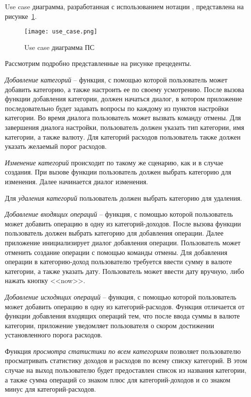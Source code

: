 Use case диаграмма, разработанная с использованием нотации \uml, представлена на рисунке~\ref{fig:domain:model:use_cases:model}.

\begin{figure}[!h]
\centering
	\texttt{[image: use\_case.png]}
	\caption{Use case диаграмма ПС}
	\label{fig:domain:model:use_cases:model}
\end{figure}

Рассмотрим подробно представленные на рисунке прецеденты.

\emph{Добавление категорий} -- функция, с помощью которой пользователь может добавить категорию, а также настроить ее по своему усмотрению. После вызова функции добавления категории, должен начаться диалог, в котором приложение последовательно будет задавать вопросы по каждому из пунктов настройки категории. Во время диалога пользователь может вызвать команду отмены. Для завершения диалога настройки, пользователь должен указать тип категории, имя категории, а также валюту. Для категорий расходов пользователь также должен указать желаемый порог расходов.

\emph{Изменение категорий} происходит по такому же сценарию, как и в случае создания. При вызове функции пользователь должен выбрать категорию для изменения. Далее начинается диалог изменения.

Для \emph{удаления категорий} пользователь должен выбрать категорию для удаления.

\emph{Добавление входящих операций} -- функция, с помощью которой пользователь может добавить операцию в одну из категорий-доходов. После вызова функции пользователь должен выбрать категорию для добавления операции. Далее приложение инициализирует диалог добавления операции. Пользователь может отменить создание операции с помощью команды отмены. Для добавления операции в категорию-доход пользователю требуется ввести сумму в валюте категории, а также указать дату. Пользователь может ввести дату вручную, либо нажать кнопку <<now>>.

\emph{Добавление исходящих операций} -- функция, с помощью которой пользователь может добавить операцию в одну из категорий-расходов. Функция отличается от функции добавления входящих операций тем, что после ввода суммы в валюте категории, приложение уведомляет пользователя о скором достижении установленного порога расходов.

Функция \emph{просмотра статистики по всем категориям} позволяет пользователю просматривать статистику доходов и расходов по всему списку категорий. В этом случае на выход пользователю будет предоставлен список из названия категории, а также сумма операций со знаком плюс для категорий-доходов и со знаком минус для категорий-расходов.

